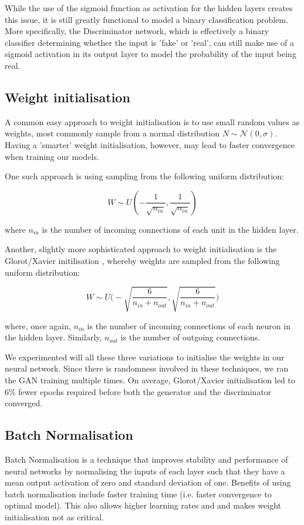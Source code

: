 While the use of the sigmoid function as activation for the hidden layers creates this issue, it is still greatly functional to model a binary classification problem. More specifically, the Discriminator network, which is effectively a binary classifier determining whether the input is 'fake' or 'real', can still make use of a sigmoid activation in its output layer to model the probability of the input being real.

\subsection{Weight initialisation}
A common easy approach to weight initialisation is to use small random values as weights, most commonly sample from a normal distribution $N\sim \mathcal{N}(0, \sigma)$. Having a 'smarter' weight initialisation, however, may lead to  faster convergence when training our models.

One such approach is using sampling from the following uniform distribution:

\begin{equation}
 W \sim U(-\frac{1}{\sqrt{n_{in}}}, \frac{1}{\sqrt{n_{in}}})
\end{equation}

where $n_{in}$ is the number of incoming connections of each unit in the hidden layer.

Another, slightly more sophisticated approach to weight initialisation is the Glorot/Xavier initilisation \citep{pmlr-v9-glorot10a}, whereby weights are sampled from the following uniform distribution:

\begin{equation}
W \sim U\Bigg(-\sqrt{\frac{6}{n_{in}+n_{out}}}, \sqrt{\frac{6}{n_{in}+n_{out}}}\Bigg)
\end{equation}

where, once again, $n_{in}$ is the number of incoming connections of each neuron in the hidden layer. Similarly, $n_{out}$ is the number of outgoing connections.

We experimented will all these three variations to initialise the weights in our neural network. Since there is randomness involved in these techniques, we ran the GAN training multiple times. On average, Glorot/Xavier initialisation led to 6\% fewer epochs required before both the generator and the discriminator converged.

\subsection{Batch Normalisation}
Batch Normalisation \citep{DBLP:journals/corr/IoffeS15} is a technique that improves stability and performance of neural networks by normalising the inputs of each layer such that they have a mean output activation of zero and standard deviation of one. Benefits of using batch normalisation include faster training time (i.e. faster convergence to optimal model). This also allows higher learning rates and and makes weight initialisation not as critical.

